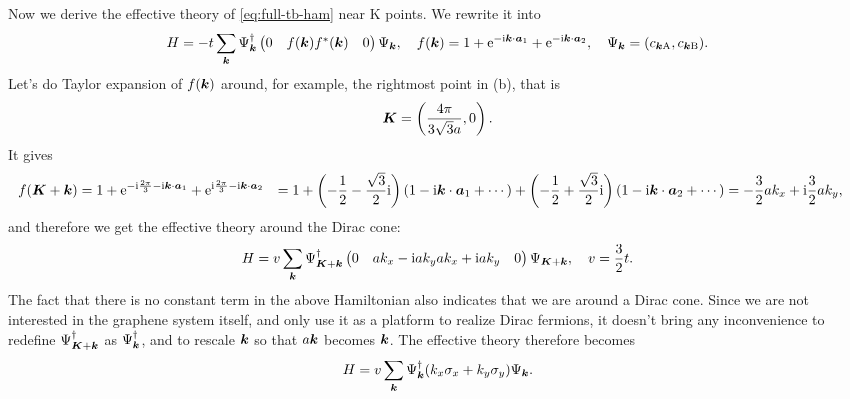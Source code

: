 \documentclass[hyperref, a4paper]{article}
\newcommand*{\ii}{\mathrm{i}}
\newcommand*{\ee}{\mathrm{e}}
\def\\{}%
\begin{document}
Now we derive the effective theory of \eqref{eq:full-tb-ham} near K points.
We rewrite it into 
\begin{equation}
    H = - t \sum_{\vb*{k}} \Psi^\dagger_{\vb*{k}} \pmqty{
        0 & f(\vb*{k}) \\ f^*(\vb*{k}) & 0
    } \Psi_{\vb*{k}}, \quad 
    f(\vb*{k}) = 1 + \ee^{- \ii \vb*{k} \cdot \vb*{a}_1} + \ee^{- \ii \vb*{k} \cdot \vb*{a}_2}, \quad 
    \Psi_{\vb*{k}} = (c_{\vb*{k} \text{A}}, c_{\vb*{k} \text{B}}).
\end{equation}
Let's do Taylor expansion of $f(\vb*{k})$ around, for example, the rightmost point in (b),
that is
\begin{equation}
    \vb*{K} = \left( \frac{4\pi}{3\sqrt{3} a}, 0 \right).
\end{equation}
It gives 
\begin{equation}
    \begin{aligned}
        f(\vb*{K} + \vb*{k}) &= 
        1 + \ee^{- \ii \frac{2\pi}{3} - \ii \vb*{k} \cdot \vb*{a}_1} 
        + \ee^{\ii \frac{2\pi}{3} - \ii \vb*{k} \cdot \vb*{a}_2} \\
        &= 1 + \left( - \frac{1}{2} - \frac{\sqrt{3}}{2} \ii \right) (1 - \ii \vb*{k} \cdot \vb*{a}_1 + \cdots)
        + \left( - \frac{1}{2} + \frac{\sqrt{3}}{2} \ii \right) (1 - \ii \vb*{k} \cdot \vb*{a}_2 + \cdots) \\
        &= - \frac{3}{2} a k_x + \ii \frac{3}{2} a k_y,
    \end{aligned}
    \label{eq:f-func}
\end{equation}
and therefore we get the effective theory around the Dirac cone:
\begin{equation}
    H = v \sum_{\vb*{k}} \Psi^\dagger_{\vb*{K} + \vb*{k}}
    \pmqty{
        0 & a k_x - \ii a k_y \\
        a k_x + \ii a k_y & 0
    } \Psi_{\vb*{K} + \vb*{k}}, \quad 
    v = \frac{3}{2} t.
\end{equation}
The fact that there is no constant term in the above Hamiltonian also indicates that 
we are around a Dirac cone.
Since we are not interested in the graphene system itself, 
and only use it as a platform to realize Dirac fermions,
it doesn't bring any inconvenience to redefine $\Psi^\dagger_{\vb*{K} + \vb*{k}}$ as $\Psi^\dagger_{\vb*{k}}$,
and to rescale $\vb*{k}$ so that $a \vb*{k}$ becomes $\vb*{k}$.
The effective theory therefore becomes 
\begin{equation}
    H = v \sum_{\vb*{k}} \Psi^\dagger_{\vb*{k}} (k_x \sigma_x + k_y \sigma_y) \Psi_{\vb*{k}}.
    \label{eq:eff-ham-k}
\end{equation}
\end{document}
